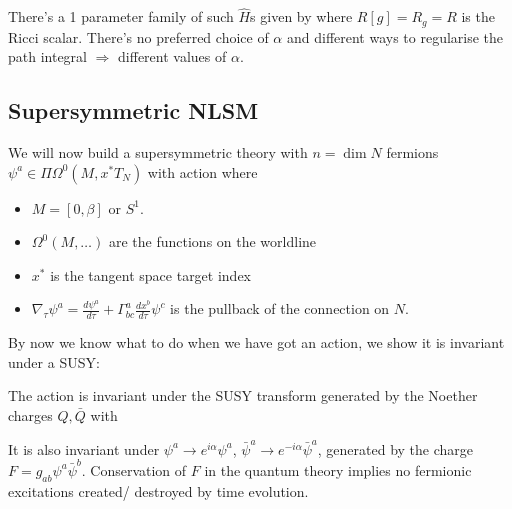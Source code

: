 \documentclass{article}
\begin{document}
There's a 1 parameter family of such $\hat{H}$s given by 
where $R[g]=R_g=R$ is the Ricci scalar. There's no preferred choice of $\alpha$ and different ways to regularise the path integral $\Rightarrow$ different values of $\alpha$. 

\subsection{Supersymmetric NLSM}
We will now build a supersymmetric theory with $n=\dim N$ fermions $\psi^a \in \Pi \Omega^0 \left( M, x^\ast T_N \right)$ with action
where 
\begin{itemize}
\item $M=[0,\beta]$ or $S^1$.
    \item $\Omega^0(M,\dots)$ are the functions on the worldline
    \item $x^\ast$ is the tangent space target index 
    \item $\nabla_\tau \psi^a = \frac{d\psi^a}{d\tau} + \Gamma^a_{bc} \frac{dx^b}{d\tau} \psi^c$ is the pullback of the connection on $N$. 
\end{itemize}
By now we know what to do when we have got an action, we show it is invariant under a SUSY:
\begin{prop}
The action is invariant under the SUSY transform 
generated by the Noether charges $Q,\bar{Q}$ with 
\end{prop}
It is also invariant under $\psi^a \to e^{i\alpha} \psi^a$, $\bar{\psi}^a \to e^{-i\alpha} \bar{\psi}^a$, generated by the charge $F=g_{ab} \psi^a \bar{\psi}^b$. Conservation of $F$ in the quantum theory implies no fermionic excitations created/ destroyed by time evolution. \\
\end{document}
